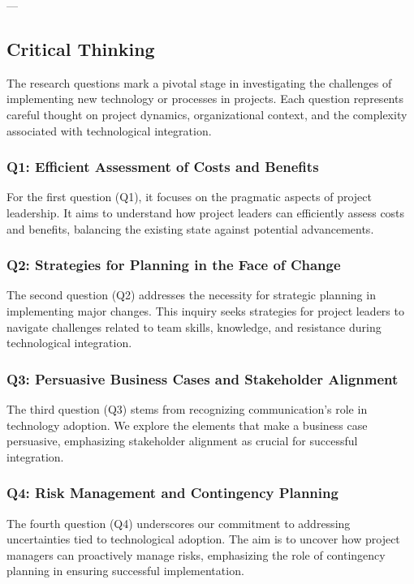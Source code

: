 \documentclass{article}
\begin{document}
---
\subsection{Critical Thinking}

The research questions mark a pivotal stage in investigating the challenges of implementing new technology or processes in projects. Each question represents careful thought on project dynamics, organizational context, and the complexity associated with technological integration.

\subsubsection*{Q1: Efficient Assessment of Costs and Benefits}

For the first question (Q1), it focuses on the pragmatic aspects of project leadership. It aims to understand how project leaders can efficiently assess costs and benefits, balancing the existing state against potential advancements.

\subsubsection*{Q2: Strategies for Planning in the Face of Change}

The second question (Q2) addresses the necessity for strategic planning in implementing major changes. This inquiry seeks strategies for project leaders to navigate challenges related to team skills, knowledge, and resistance during technological integration.

\subsubsection*{Q3: Persuasive Business Cases and Stakeholder Alignment}

The third question (Q3) stems from recognizing communication’s role in technology adoption. We explore the elements that make a business case persuasive, emphasizing stakeholder alignment as crucial for successful integration.

\subsubsection*{Q4: Risk Management and Contingency Planning}

The fourth question (Q4) underscores our commitment to addressing uncertainties tied to technological adoption. The aim is to uncover how project managers can proactively manage risks, emphasizing the role of contingency planning in ensuring successful implementation.
\newline
\end{document}
